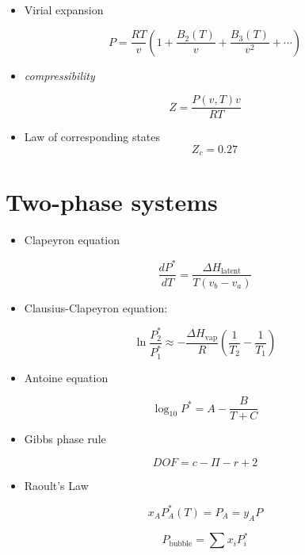 \documentclass[11pt]{article}
\begin{document}
\begin{itemize}
\item Virial expansion
\end{itemize}

\[ P= \frac{RT}{v} \left ( 1 + \frac{B_{2}(T)}{v} + \frac{B_{3}(T)}{v^{2}} + \cdots \right ) \]

\begin{itemize}
\item \emph{compressibility}
\end{itemize}
\[ Z = \frac{P(v,T) v}{RT} \]

\begin{itemize}
\item Law of corresponding states
\[ Z_{c} = 0.27 \]
\end{itemize}

\section{Two-phase systems}
\label{sec-5}

\begin{itemize}
\item Clapeyron equation
\end{itemize}
\[ \frac{d P^{*}}{dT} = \frac{\Delta H_{\text{latent}}}{T(v_{b}-v_{a})} \]

\begin{itemize}
\item Clausius-Clapeyron equation:
\end{itemize}
\[ \ln \frac{P^{*}_{2}}{P^{*}_{1}} \approx -\frac{\Delta H_{\text{vap}}}{R}\left ( \frac{1}{T_{2}} - \frac{1}{T_{1}} \right ) \]

\begin{itemize}
\item Antoine equation
\end{itemize}
\[ \log_{10}P^{*} = A - \frac{B}{T+C} \]

\begin{itemize}
\item Gibbs phase rule
\end{itemize}

\[ DOF = c - \Pi - r + 2\]

\begin{itemize}
\item Raoult's Law
\end{itemize}

\[ x_{A} P^{*}_{A}(T) = P_{A} = y_{A} P \]

\[ P_{\text{bubble}} = \sum x_{i} P_{i}^{*} \]
\end{document}
